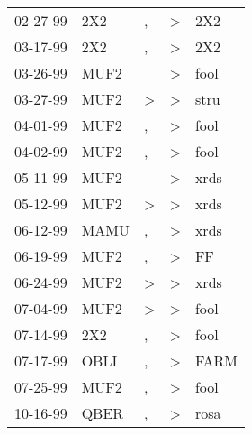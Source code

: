 \begin{supertabular}{p{0.07\textwidth}p{0.06\textwidth}p{0.02\textwidth}p{0.02\textwidth}p{0.06\textwidth}}
 02-27-99\textsuperscript{} &   2X2\textsuperscript{} &             , &  \textgreater &   2X2\textsuperscript{} \\
 03-17-99\textsuperscript{} &   2X2\textsuperscript{} &             , &  \textgreater &   2X2\textsuperscript{} \\
 03-26-99\textsuperscript{} &  MUF2\textsuperscript{} &               &  \textgreater &  fool\textsuperscript{} \\
 03-27-99\textsuperscript{} &  MUF2\textsuperscript{} &  \textgreater &  \textgreater &  stru\textsuperscript{} \\
 04-01-99\textsuperscript{} &  MUF2\textsuperscript{} &             , &  \textgreater &  fool\textsuperscript{} \\
 04-02-99\textsuperscript{} &  MUF2\textsuperscript{} &             , &  \textgreater &  fool\textsuperscript{} \\
 05-11-99\textsuperscript{} &  MUF2\textsuperscript{} &               &  \textgreater &  xrds\textsuperscript{} \\
 05-12-99\textsuperscript{} &  MUF2\textsuperscript{} &  \textgreater &  \textgreater &  xrds\textsuperscript{} \\
 06-12-99\textsuperscript{} &  MAMU\textsuperscript{} &             , &  \textgreater &  xrds\textsuperscript{} \\
 06-19-99\textsuperscript{} &  MUF2\textsuperscript{} &             , &  \textgreater &    FF\textsuperscript{} \\
 06-24-99\textsuperscript{} &  MUF2\textsuperscript{} &  \textgreater &  \textgreater &  xrds\textsuperscript{} \\
 07-04-99\textsuperscript{} &  MUF2\textsuperscript{} &  \textgreater &  \textgreater &  fool\textsuperscript{} \\
 07-14-99\textsuperscript{} &   2X2\textsuperscript{} &             , &  \textgreater &  fool\textsuperscript{} \\
 07-17-99\textsuperscript{} &  OBLI\textsuperscript{} &             , &  \textgreater &  FARM\textsuperscript{} \\
 07-25-99\textsuperscript{} &  MUF2\textsuperscript{} &             , &  \textgreater &  fool\textsuperscript{} \\
 10-16-99\textsuperscript{} &  QBER\textsuperscript{} &             , &  \textgreater &  rosa\textsuperscript{} \\

\end{supertabular}
